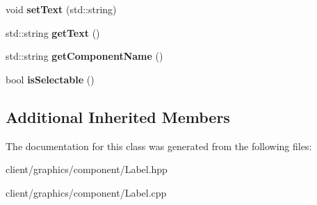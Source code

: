\begin{DoxyCompactItemize}
\item 
\hypertarget{classgraphics_1_1_label_a712de10631462af1f8bb0970d759e9d1}{void {\bfseries set\-Text} (std\-::string)}\label{classgraphics_1_1_label_a712de10631462af1f8bb0970d759e9d1}

\item 
\hypertarget{classgraphics_1_1_label_aa781d7f86fbd676871aacd9e96c25341}{std\-::string {\bfseries get\-Text} ()}\label{classgraphics_1_1_label_aa781d7f86fbd676871aacd9e96c25341}

\item 
\hypertarget{classgraphics_1_1_label_a6d3dc8fb750ba4cafbb4ee3314dd675b}{std\-::string {\bfseries get\-Component\-Name} ()}\label{classgraphics_1_1_label_a6d3dc8fb750ba4cafbb4ee3314dd675b}

\item 
\hypertarget{classgraphics_1_1_label_a35152f8eed4d2bfced2ee194d00e95b1}{bool {\bfseries is\-Selectable} ()}\label{classgraphics_1_1_label_a35152f8eed4d2bfced2ee194d00e95b1}

\end{DoxyCompactItemize}
\subsection*{Additional Inherited Members}


The documentation for this class was generated from the following files\-:\begin{DoxyCompactItemize}
\item 
client/graphics/component/Label.\-hpp\item 
client/graphics/component/Label.\-cpp\end{DoxyCompactItemize}
